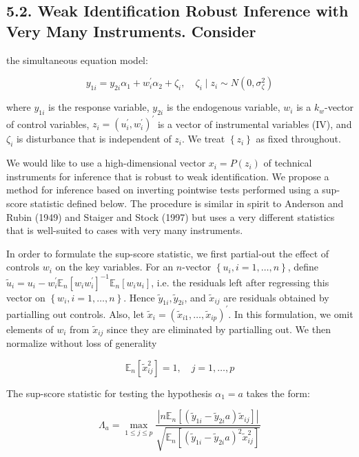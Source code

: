 \documentclass[10pt]{article}
\begin{document}
\subsection*{5.2. Weak Identification Robust Inference with Very Many Instruments. Consider}
the simultaneous equation model:

\[
y_{1 i}=y_{2 i} \alpha_{1}+w_{i}^{\prime} \alpha_{2}+\zeta_{i}, \quad \zeta_{i} \mid z_{i} \sim N\left(0, \sigma_{\zeta}^{2}\right)
\]

where \(y_{1 i}\) is the response variable, \(y_{2 i}\) is the endogenous variable, \(w_{i}\) is a \(k_{w}\)-vector of control variables, \(z_{i}=\left(u_{i}^{\prime}, w_{i}^{\prime}\right)^{\prime}\) is a vector of instrumental variables (IV), and \(\zeta_{i}\) is disturbance that is independent of \(z_{i}\). We treat \(\left\{z_{i}\right\}\) as fixed throughout.

We would like to use a high-dimensional vector \(x_{i}=P\left(z_{i}\right)\) of technical instruments for inference that is robust to weak identification. We propose a method for inference based on inverting pointwise tests performed using a sup-score statistic defined below. The procedure is similar in spirit to Anderson and Rubin (1949) and Staiger and Stock (1997) but uses a very different statistics that is well-suited to cases with very many instruments.

In order to formulate the sup-score statistic, we first partial-out the effect of controls \(w_{i}\) on the key variables. For an \(n\)-vector \(\left\{u_{i}, i=1, \ldots, n\right\}\), define \(\tilde{u}_{i}=u_{i}-w_{i}^{\prime} \mathbb{E}_{n}\left[w_{i} w_{i}^{\prime}\right]^{-1} \mathbb{E}_{n}\left[w_{i} u_{i}\right]\), i.e. the residuals left after regressing this vector on \(\left\{w_{i}, i=1, \ldots, n\right\}\). Hence \(\tilde{y}_{1 i}, \tilde{y}_{2 i}\), and \(\tilde{x}_{i j}\) are residuals obtained by partialling out controls. Also, let \(\tilde{x}_{i}=\left(\tilde{x}_{i 1}, \ldots, \tilde{x}_{i p}\right)^{\prime}\). In this formulation, we omit elements of \(w_{i}\) from \(\tilde{x}_{i j}\) since they are eliminated by partialling out. We then normalize without loss of generality

\[
\mathbb{E}_{n}\left[\tilde{x}_{i j}^{2}\right]=1, \quad j=1, \ldots, p
\]

The sup-score statistic for testing the hypothesis \(\alpha_{1}=a\) takes the form:

\[
\Lambda_{a}=\max _{1 \leqslant j \leqslant p} \frac{\left|n \mathbb{E}_{n}\left[\left(\tilde{y}_{1 i}-\tilde{y}_{2 i} a\right) \tilde{x}_{i j}\right]\right|}{\sqrt{\mathbb{E}_{n}\left[\left(\tilde{y}_{1 i}-\tilde{y}_{2 i} a\right)^{2} \tilde{x}_{i j}^{2}\right]}}
\]
\end{document}
